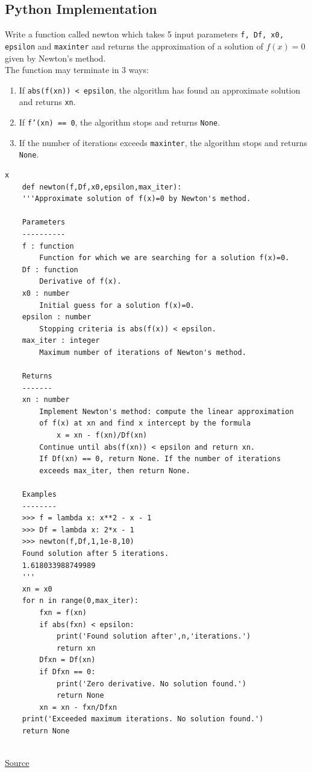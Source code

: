\documentclass[a4paper, 12pt, reqno]{article}
\begin{document}
\subsection{Python Implementation}
Write a function called newton which takes 5 input parameters \texttt{f, Df, x0, epsilon} and \texttt{maxinter} 
and returns the approximation of a solution of $f(x)=0$ given by Newton's method. \\
The function may terminate in 3 ways:
\begin{enumerate}
    \item If \texttt{abs(f(xn)) < epsilon}, the algorithm has found an approximate solution and returns \texttt{xn}.
    \item If \texttt{f'(xn) == 0}, the algorithm stops and returns \texttt{None}.
    \item If the number of iterations exceeds \texttt{maxinter}, the algorithm stops and returns \texttt{None}.
\end{enumerate}

\begin{lstlisting}[frame=single]  % Start your code-block
    x
    def newton(f,Df,x0,epsilon,max_iter):
    '''Approximate solution of f(x)=0 by Newton's method.

    Parameters
    ----------
    f : function
        Function for which we are searching for a solution f(x)=0.
    Df : function
        Derivative of f(x).
    x0 : number
        Initial guess for a solution f(x)=0.
    epsilon : number
        Stopping criteria is abs(f(x)) < epsilon.
    max_iter : integer
        Maximum number of iterations of Newton's method.

    Returns
    -------
    xn : number
        Implement Newton's method: compute the linear approximation
        of f(x) at xn and find x intercept by the formula
            x = xn - f(xn)/Df(xn)
        Continue until abs(f(xn)) < epsilon and return xn.
        If Df(xn) == 0, return None. If the number of iterations
        exceeds max_iter, then return None.

    Examples
    --------
    >>> f = lambda x: x**2 - x - 1
    >>> Df = lambda x: 2*x - 1
    >>> newton(f,Df,1,1e-8,10)
    Found solution after 5 iterations.
    1.618033988749989
    '''
    xn = x0
    for n in range(0,max_iter):
        fxn = f(xn)
        if abs(fxn) < epsilon:
            print('Found solution after',n,'iterations.')
            return xn
        Dfxn = Df(xn)
        if Dfxn == 0:
            print('Zero derivative. No solution found.')
            return None
        xn = xn - fxn/Dfxn
    print('Exceeded maximum iterations. No solution found.')
    return None
    
    \end{lstlisting}
    \href{https://personal.math.ubc.ca/~pwalls/math-python/roots-optimization/newton/}{Source}
\end{document}
